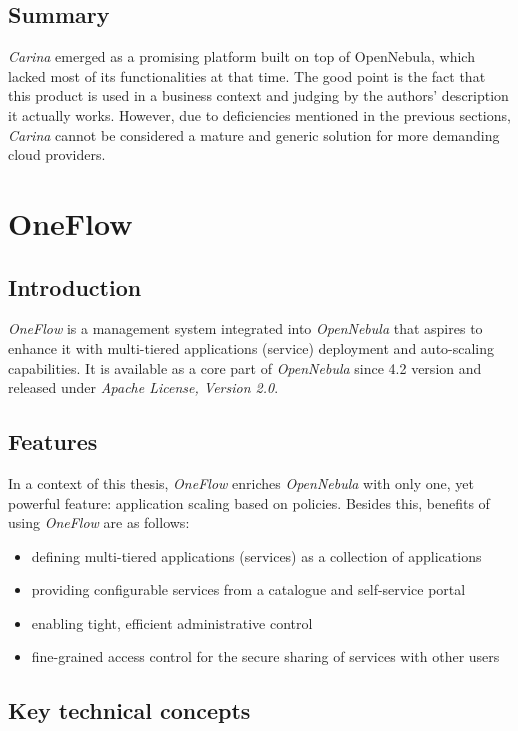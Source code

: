 \subsection{Summary}
\emph{Carina} emerged as a promising platform built on top of OpenNebula, which lacked most of its functionalities at that time. The good point is the fact that this product is used in a business context and judging by the authors' description it actually works. However, due to deficiencies mentioned in the previous sections, \emph{Carina} cannot be considered a mature and generic solution for more demanding cloud providers.



\section{OneFlow}

\subsection{Introduction}
\emph{OneFlow} \cite{OneFlow} is a management system integrated into \emph{OpenNebula} that aspires to enhance it with multi-tiered applications (service) deployment and auto-scaling capabilities. It is available as a core part of \emph{OpenNebula} since 4.2 version and released under \emph{Apache License, Version 2.0}. 

\subsection{Features}
In a context of this thesis, \emph{OneFlow} enriches \emph{OpenNebula} with only one, yet powerful feature: application scaling based on policies. Besides this, benefits of using \emph{OneFlow} are as follows:
\begin{itemize}
\item defining multi-tiered applications (services) as a collection of applications
\item providing configurable services from a catalogue and self-service portal
\item enabling tight, efficient administrative control
\item fine-grained access control for the secure sharing of services with other users
\end{itemize}

\subsection{Key technical concepts}
